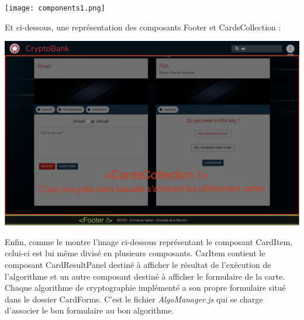 \documentclass{article}
\begin{document}
\bigskip
\bigskip

\begin{center}
  \texttt{[image: components1.png]}
\end{center}

\cleardoublepage

Et ci-dessous, une représentation des composants Footer et CardsCollection :
\bigskip
\begin{center}
  \includegraphics[scale=0.1]{components2.png}
\end{center}
\bigskip

Enfin, comme le montre l'image ci-dessous représentant le composant CardItem, celui-ci est lui même divisé en plusieurs composants. CarItem contient le composant CardResultPanel destiné à afficher le résultat de l'exécution de l'algorithme et un autre composant destiné à afficher le formulaire de la carte. Chaque algorithme de cryptographie implémenté a son propre formulaire situé dans le dossier CardForms. C'est le fichier \textit{AlgoManager.js} qui se charge d'associer le bon formulaire au bon algorithme. 
\end{document}

